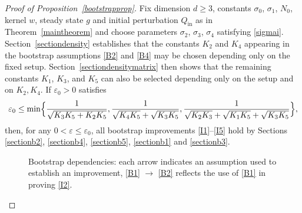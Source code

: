 \documentclass[JEP,XML,SOM,Unicode]{cedram}
\theoremstyle{plain}
\theoremstyle{remark}
\newcommand{\Bset}[1]{\Bigl\{#1\Bigr\}}
\newcommand{\ep}{\varepsilon}
\newcommand{\Qin}{Q_{\mathrm{in}}}
\begin{document}
\begin{proof}[Proof of Proposition~\ref{bootstrapprop}]
Fix dimension $d\geq 3$, constants $\sigma_0$, $\sigma_1$, $N_0$, kernel $w$, steady state $g$ and initial perturbation $\Qin$ as in Theorem~\ref{maintheorem} and choose parameters $\sigma_2$, $\sigma_3$, $\sigma_4$ satisfying \eqref{sigmai}. Section~\ref{sectiondensity} establishes that the constants $K_2$ and $K_4$ appearing in the bootstrap assumptions \eqref{B2} and \eqref{B4} may be chosen depending only on the fixed setup. Section~\ref{sectiondensitymatrix} then shows that the remaining constants $K_1$, $K_3$, and $K_5$ can also be selected depending only on the setup and on $K_2, K_4$. If $\ep_0>0$ satisfies
\begin{align*}
\ep_0\leq\min\Bset{\frac{1}{\sqrt{K_3K_5+K_2K_5}},\frac{1}{\sqrt{K_4K_5}+\sqrt{K_3K_5}},\frac{1}{\sqrt{K_2K_3}+\sqrt{K_1K_5}+\sqrt{K_3K_5}}},
\end{align*}
then, for any $0<\ep\leq \ep_0$, all bootstrap improvements \eqref{I1}--\eqref{I5} hold by Sections \ref{sectionb2}, \ref{sectionb4}, \ref{sectionb5}, \ref{sectionb1} and \ref{sectionb3}.

\begin{figure}[ht]
\centering
{}
\captionsetup{width=.7\linewidth}
\caption{Bootstrap dependencies: each arrow indicates an assumption used to establish an improvement, \eg \eqref{B1} $\rightarrow$ \eqref{B2} reflects the use of \eqref{B1} in proving \eqref{I2}.}


\end{figure}
\end{proof}
\end{document}

